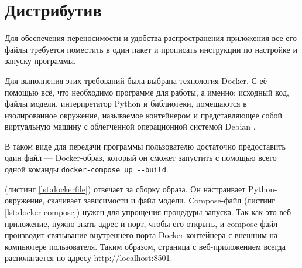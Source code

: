 \section{Дистрибутив}

Для обеспечения переносимости и удобства распространения приложения все его файлы требуется поместить в один пакет и прописать инструкции по настройке и запуску программы.

Для выполнения этих требований была выбрана технология Docker. С её помощью всё, что необходимо программе для работы, а именно: исходный код, файлы модели, интерпретатор Python и библиотеки, помещаются в изолированное окружение, называемое контейнером и представляющее собой виртуальную машину с облегчённой операционной системой Debian \cite{doc:docker}.

В таком виде для передачи программы пользователю достаточно предоставить один файл --- Docker-образ, который он сможет запустить с помощью всего одной команды \verb|docker-compose up --build|.




 (листинг \ref*{lst:dockerfile}) отвечает за сборку образа. Он настраивает Python-окружение, скачивает зависимости и файл модели. Compose-файл (листинг \ref*{lst:docker-compose}) нужен для упрощения процедуры запуска. Так как это веб-приложение, нужно знать адрес и порт, чтобы его открыть, и compose-файл производит связывание внутреннего порта Docker-контейнера с внешним на компьютере пользователя. Таким образом, страница с веб-приложением всегда располагается по адресу http://localhost:8501.